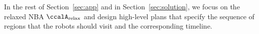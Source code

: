 \documentclass[Afour,sageh,times]{sagej}
\newcommand{\auto}[1]{\ccalA_{\textup{#1}}}
\newcommand{\vertex}[1]{v_{\textup{#1}}}
\newcommand{\domanda}[1]{\subsubsection*{#1}}
\begin{document}
{In the rest of Section~\ref{sec:app} and in Section~\ref{sec:solution}, we focus on the relaxed NBA $\auto{relax}$ and design high-level plans that specify the sequence of regions that the robots should visit and the corresponding timeline.



}
\end{document}
